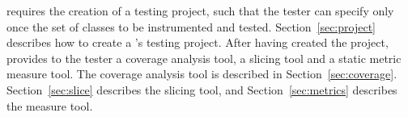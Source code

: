 \toolname requires the creation of a testing project, such that
the tester can specify only once the set of classes to be
instrumented and tested. Section~\ref{sec:project} describes how
to create a \toolname's testing project. After having created the
project, \toolname provides to the tester a coverage analysis
tool, a slicing tool and a static metric measure tool. The
coverage analysis tool is described in Section~\ref{sec:coverage}.
Section~\ref{sec:slice} describes the slicing tool, and
Section~\ref{sec:metrics} describes the measure tool.
